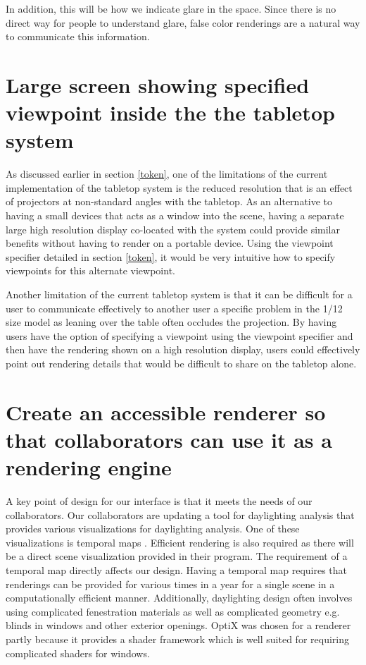 In addition, this will be how we indicate glare in the space.  Since there is no direct way for people to understand glare, false color renderings are a natural way to communicate this information.

\section{Large screen showing specified viewpoint inside the the tabletop system}

As discussed earlier in section \ref{token}, one of the limitations of the current implementation of the tabletop system is the reduced resolution that is an effect of projectors at non-standard angles with the tabletop.  As an alternative to having a small devices that acts as a window into the scene, having a separate large high resolution display co-located with the system could provide similar benefits without having to render on a portable device.  Using the viewpoint specifier detailed in section \ref{token}, it would be very intuitive how to specify viewpoints for this alternate viewpoint.  

Another limitation of the current tabletop system is that it can be difficult for a user to communicate effectively to another user a specific problem in the 1/12 size model as leaning over the table often occludes the projection.  By having users have the option of specifying a viewpoint using the viewpoint specifier and then have the rendering shown on a high resolution display, users could effectively point out rendering details that would be difficult to share on the tabletop alone.

\section{Create an accessible renderer so that collaborators can use it as a rendering engine}

A key point of design for our interface is that it meets the needs of our collaborators.  Our collaborators are updating a tool for daylighting analysis that provides various visualizations for daylighting analysis.  One of these visualizations is temporal maps .  Efficient rendering is also required as there will be a direct scene visualization provided in their program.  The requirement of a temporal map directly affects our design.  Having a temporal map requires that renderings can be provided for various times in a year for a single scene in a computationally efficient manner.  Additionally, daylighting design often involves using complicated fenestration materials as well as complicated geometry e.g. blinds in windows and other exterior openings.  OptiX was chosen for a renderer partly because it provides a shader framework which is well suited for requiring complicated shaders for windows.

